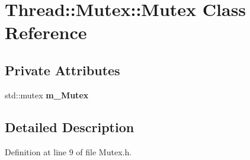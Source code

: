 \hypertarget{class_thread_1_1_mutex_1_1_mutex}{}\section{Thread\+:\+:Mutex\+:\+:Mutex Class Reference}
\label{class_thread_1_1_mutex_1_1_mutex}
\subsection*{Private Attributes}
\begin{DoxyCompactItemize}
\item 
std\+::mutex {\bfseries m\+\_\+\+Mutex}\hypertarget{class_thread_1_1_mutex_1_1_mutex_a265655225f19d0dc58d7ded0aa95e33e}{}\label{class_thread_1_1_mutex_1_1_mutex_a265655225f19d0dc58d7ded0aa95e33e}

\end{DoxyCompactItemize}


\subsection{Detailed Description}


Definition at line 9 of file Mutex.\+h.

